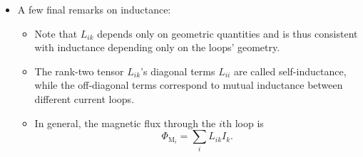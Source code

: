 \documentclass[11pt, a4paper]{article}
\begin{document}
\begin{itemize}
	\item A few final remarks on inductance:
    \begin{itemize}
        \item Note that $ L_{ik} $ depends only on geometric quantities and is thus consistent with inductance depending only on the loops' geometry.

        \item The rank-two tensor $ L_{ik} $'s diagonal terms $ L_{ii} $ are called self-inductance, while the off-diagonal terms correspond to mutual inductance between different current loops.

        \item In general, the magnetic flux through the $ i $th loop is
        \begin{equation*}
            \Phi_{\text{M}_{i}} = \sum_{i} L_{ik}I_{k}.
        \end{equation*}
    \end{itemize}

\end{itemize}
\end{document}
